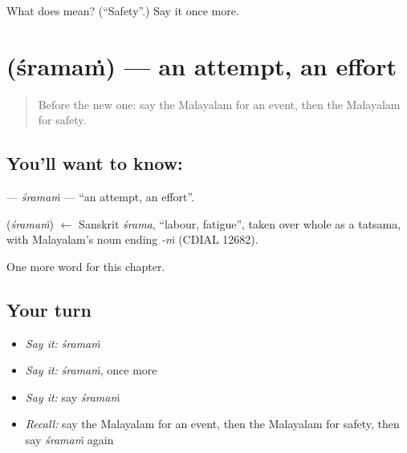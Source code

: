 \begin{tcolorbox}[breakable,colback=teal!4,colframe=teal!35!black,title={Before you move on}]
What does  mean? (\textquotedblleft{}Safety\textquotedblright{}.) Say it once more.
\end{tcolorbox}
\section[\texorpdfstring{\ml{ശ്രമം} (śramaṁ)}{ശ്രമം (śramaṁ)}]{ (śramaṁ) — an attempt, an effort}

\label{lesson:ML-C282-sramam}



\begin{quote}
Before the new one: say the Malayalam for an event, then the Malayalam for safety.
\end{quote}

\subsection*{You'll want to know: }
\textbf{} — \emph{śramaṁ} — \textquotedblleft{}an attempt, an effort\textquotedblright{}.

\begin{cousinweb}
\textbf{} (\emph{śramaṁ}) $\leftarrow$ Sanskrit \emph{śrama}, \textquotedblleft{}labour, fatigue\textquotedblright{}, taken over whole as a tatsama, with Malayalam's noun ending \emph{-ṁ} (CDIAL 12682).
\end{cousinweb}

\begin{grammarlens}[title={What you've built}]
One more word for this chapter.
\end{grammarlens}

\subsection*{Your turn}
\begin{itemize}
\raggedright
  \item \emph{Say it:} \emph{śramaṁ}
  \item \emph{Say it:} \emph{śramaṁ}, once more
  \item \emph{Say it:} say \emph{śramaṁ}
  \item \emph{Recall:} say the Malayalam for an event, then the Malayalam for safety, then say \emph{śramaṁ} again
\end{itemize}

